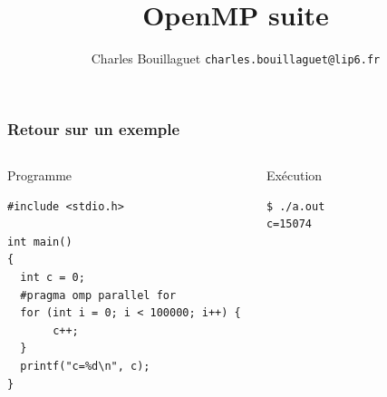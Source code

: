 \documentclass[xcolor={x11names,svgnames}]{beamer}
\author[C.~Bouillaguet]{Charles Bouillaguet \newline
  {\small \texttt{charles.bouillaguet@lip6.fr}}}
\title{OpenMP suite}
\begin{document}
\begin{frame}
  \titlepage
\end{frame}


\begin{frame}[fragile]
  \frametitle{Retour sur un exemple}

  \begin{columns}[t]
  \column{5.5cm}
\begin{block}{Programme}
\begin{verbatim}
#include <stdio.h>
  
int main()
{
  int c = 0;
  #pragma omp parallel for
  for (int i = 0; i < 100000; i++) { 
       c++; 
  }
  printf("c=%d\n", c);
}
\end{verbatim}
\end{block}
    
    
    \column{4.5cm}
\begin{block}{Exécution}    
\footnotesize
\begin{verbatim}
$ ./a.out
c=15074
\end{verbatim}
\end{block}    
  \end{columns}
\end{frame}
\end{document}
